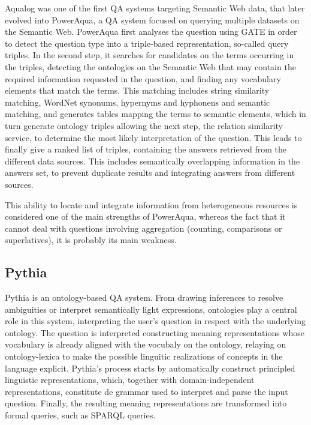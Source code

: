 Aqualog was one of the first \ac{QA} systems targeting Semantic Web data, that later evolved into PowerAqua, a \ac{QA} system focused on querying multiple datasets on the Semantic Web. PowerAqua first analyses the question using GATE in order to detect the question type into a triple-based representation, so-called query triples. In the second step, it searches for candidates on the terms occurring in the triples, detecting the ontologies on the Semantic Web that may contain the required information requested in the question, and finding any vocabulary elements that match the terms. This matching includes string similarity matching, WordNet synonums, hypernyms and hyphonens and semantic matching, and generates tables mapping the terms to semantic elements, which in turn generate ontology triples allowing the next step, the relation similarity service, to determine the most likely interpretation of the question. This leads to finally give a ranked list of triples, containing the answers retrieved from the different data sources. This includes semantically overlapping information in the answers set, to prevent duplicate results and integrating answers from different sources.

This ability to locate and integrate information from heterogeneous resources is considered one of the main strengths of PowerAqua, whereas the fact that it cannot deal with questions involving aggregation (counting, comparisons or superlatives), it is probably its main weakness.

\subsection{Pythia}

Pythia is an ontology-based \ac{QA} system. From drawing inferences to resolve ambiguities or interpret semantically light expressions, ontologies play a central role in this system, interpreting the user's question in respect with the underlying ontology. The question is interpreted constructing meaning representations whose vocabulary is already aligned with the vocubaly on the ontology, relaying on ontology-lexica to make the possible linguitic realizations of concepts in the language explicit. Pythia's process starts by automatically construct principled linguistic representations, which, together with domain-independent representations, constitute de grammar used to interpret and parse the input question. Finally, the resulting meaning representations are transformed into formal queries, such as SPARQL queries.

